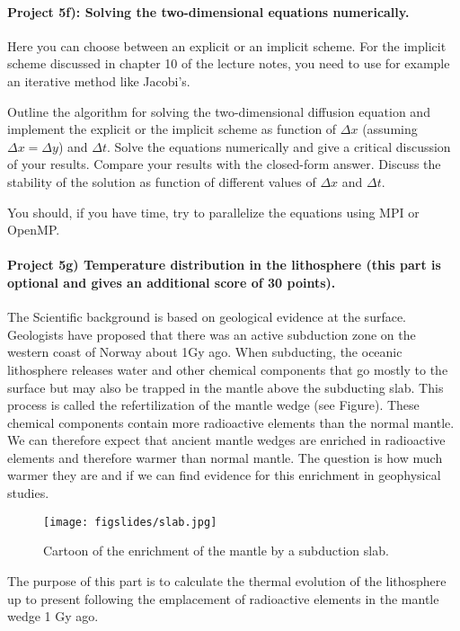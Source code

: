 \documentclass[%
oneside,                 %
final,                   %
10pt]{article}
\begin{document}
\paragraph{Project 5f): Solving the two-dimensional equations numerically.}
Here you can choose between an explicit or an implicit scheme. 
For the implicit scheme discussed in chapter 10 of the lecture notes, you need to use for example an iterative method like Jacobi's.

Outline the algorithm for solving the two-dimensional diffusion equation and 
implement the explicit or the implicit scheme as function of $\Delta x$ (assuming
$\Delta x = \Delta y$) and $\Delta t$. Solve the equations numerically and give a critical discussion of your results. 
Compare your results with the closed-form answer. Discuss the stability
of the solution as function of different values of $\Delta x$  and $\Delta t$. 

You should, if you have time, try to  parallelize the equations using MPI or OpenMP. 


\paragraph{Project 5g) Temperature distribution in the lithosphere (this part is optional and gives an additional score of 30 points).}
The Scientific background is  based on geological evidence at the surface. Geologists have proposed
that there was an active subduction zone on the western coast of
Norway about 1Gy ago. When subducting, the oceanic lithosphere
releases water and other chemical components that go mostly to the
surface but may also be trapped in the mantle above the subducting
slab. This process is called the refertilization of the mantle wedge
(see Figure). These chemical components contain more radioactive
elements than the normal mantle. We can therefore expect that ancient
mantle wedges are enriched in radioactive elements and therefore
warmer than normal mantle. The question is how much warmer they are
and if we can find evidence for this enrichment in geophysical
studies.

\begin{figure}[!ht]  %
  \centerline{\texttt{[image: figslides/slab.jpg]}}
  \caption{
  Cartoon of the enrichment of the mantle by a subduction slab.
  }
\end{figure}


The purpose of this part is to 
calculate the thermal evolution of the lithosphere up to present following the emplacement of radioactive elements in the mantle wedge 1 Gy ago.
\end{document}
